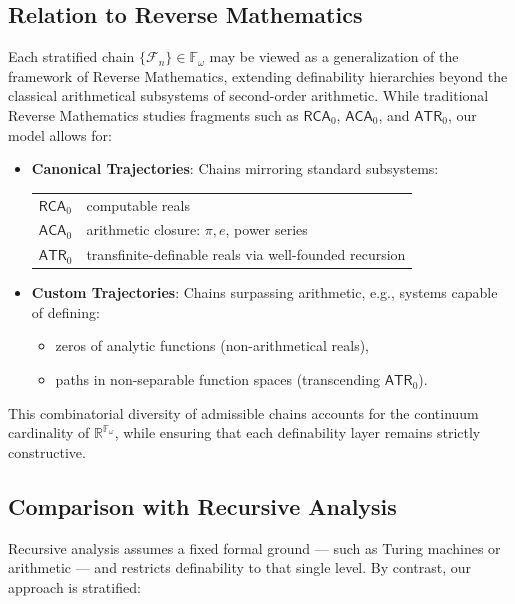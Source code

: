 \documentclass[12pt]{article}
\theoremstyle{definition}
\theoremstyle{plain}
\theoremstyle{remark}
\begin{document}
\subsection*{Relation to Reverse Mathematics}

Each stratified chain \( \{\mathcal{F}_n\} \in \mathbb{F}_\omega \) may be viewed as a generalization of the framework of Reverse Mathematics, extending definability hierarchies beyond the classical arithmetical subsystems of second-order arithmetic. While traditional Reverse Mathematics studies fragments such as \( \mathsf{RCA}_0 \), \( \mathsf{ACA}_0 \), and \( \mathsf{ATR}_0 \), our model allows for:

\begin{itemize}
    \item \textbf{Canonical Trajectories}: Chains mirroring standard subsystems:
    \begin{center}
    \begin{tabular}{@{} l l @{}}
    \( \mathsf{RCA}_0 \) & computable reals \\
    \( \mathsf{ACA}_0 \) & arithmetic closure: \( \pi, e \), power series \\
    \( \mathsf{ATR}_0 \) & transfinite-definable reals via well-founded recursion \\
    \end{tabular}
    \end{center}
    
    \item \textbf{Custom Trajectories}: Chains surpassing arithmetic, e.g., systems capable of defining:
    \begin{itemize}
        \item zeros of analytic functions (non-arithmetical reals),
        \item paths in non-separable function spaces (transcending \( \mathsf{ATR}_0 \)).
    \end{itemize}
\end{itemize}

This combinatorial diversity of admissible chains accounts for the continuum cardinality of \( \mathbb{R}^{\mathbb{F}_\omega} \), while ensuring that each definability layer remains strictly constructive.

\subsection*{Comparison with Recursive Analysis}

Recursive analysis assumes a fixed formal ground — such as Turing machines or arithmetic — and restricts definability to that single level. By contrast, our approach is stratified:
\end{document}
